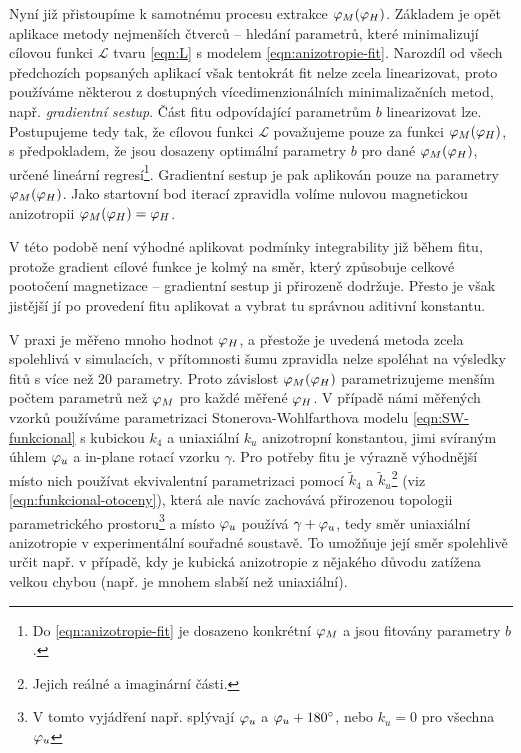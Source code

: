 Nyní již přistoupíme k samotnému procesu extrakce $\varphi_M(\varphi_H)$.
Základem je opět aplikace metody nejmenších čtverců -- hledání parametrů, které minimalizují cílovou funkci $\mathcal{L}$ tvaru \eqref{eqn:L} s modelem \eqref{eqn:anizotropie-fit}.
Narozdíl od všech předchozích popsaných aplikací však tentokrát fit nelze zcela linearizovat, proto používáme některou z dostupných vícedimenzionálních minimalizačních metod, např. \emph{gradientní sestup}.
Část fitu odpovídající parametrům $b$ linearizovat lze.
Postupujeme tedy tak, že cílovou funkci $\mathcal{L}$ považujeme pouze za funkci $\varphi_M(\varphi_H)$, s předpokladem, že jsou dosazeny optimální parametry $b$ pro dané $\varphi_M(\varphi_H)$, určené lineární regresí\footnote{Do \eqref{eqn:anizotropie-fit} je dosazeno konkrétní $\varphi_M$ a jsou fitovány parametry $b$.}.
Gradientní sestup je pak aplikován pouze na parametry $\varphi_M(\varphi_H)$.
Jako startovní bod iterací zpravidla volíme nulovou magnetickou anizotropii $\varphi_M(\varphi_H)=\varphi_H$.

V této podobě není výhodné aplikovat podmínky integrability již během fitu, protože gradient cílové funkce je kolmý na směr, který způsobuje celkové pootočení magnetizace -- gradientní sestup ji přirozeně dodržuje.
Přesto je však jistější jí po provedení fitu aplikovat a vybrat tu správnou aditivní konstantu.

V praxi je měřeno mnoho hodnot $\varphi_H$, a přestože je uvedená metoda zcela spolehlivá v simulacích, v přítomnosti šumu zpravidla nelze spoléhat na výsledky fitů s více než 20 parametry.
Proto závislost $\varphi_M(\varphi_H)$ parametrizujeme menším počtem parametrů než $\varphi_M$ pro každé měřené $\varphi_H$.
V případě námi měřených vzorků používáme parametrizaci Stonerova-Wohlfarthova modelu \eqref{eqn:SW-funkcional} s kubickou $k_4$ a uniaxiální $k_u$ anizotropní konstantou, jimi svíraným úhlem $\varphi_u$ a in-plane rotací vzorku $\gamma$.
Pro potřeby fitu je výrazně výhodnější místo nich používat ekvivalentní parametrizaci pomocí $\tilde{k}_4$ a $\tilde{k}_u$\footnote{Jejich reálné a imaginární části.} (viz \eqref{eqn:funkcional-otoceny}), která ale navíc zachovává přirozenou topologii parametrického prostoru\footnote{V tomto vyjádření např. splývají $\varphi_u$ a $\varphi_u+\SI{180}{\degree}$, nebo $k_u=0$ pro všechna $\varphi_u$} a místo $\varphi_u$ používá $\gamma+\varphi_u$, tedy směr uniaxiální anizotropie v experimentální souřadné soustavě.
To umožňuje její směr spolehlivě určit např. v případě, kdy je kubická anizotropie z nějakého důvodu zatížena velkou chybou (např. je mnohem slabší než uniaxiální).

